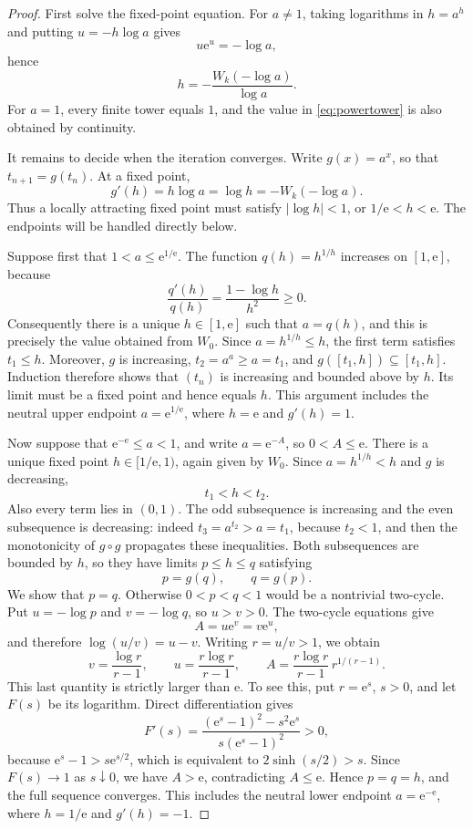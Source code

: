 \documentclass[11pt,openany]{book}
\newcommand{\e}{\mathrm{e}}
\newcommand{\abs}[1]{\left|#1\right|}
\theoremstyle{plain}
\theoremstyle{definition}
\theoremstyle{remark}
\begin{document}
\begin{proof}
First solve the fixed-point equation.  For \(a\ne1\), taking logarithms in
\(h=a^h\) and putting \(u=-h\log a\) gives
\[
             u\e^u=-\log a,
\]
hence
\[
             h=-\frac{W_k(-\log a)}{\log a}.
\]
For \(a=1\), every finite tower equals \(1\), and the value in
\eqref{eq:powertower} is also obtained by continuity.

It remains to decide when the iteration converges.  Write
\(g(x)=a^x\), so that \(t_{n+1}=g(t_n)\).  At a fixed point,
\[
       g'(h)=h\log a=\log h=-W_k(-\log a).
\]
Thus a locally attracting fixed point must satisfy \(\abs{\log h}<1\), or
\(1/\e<h<\e\).  The endpoints will be handled directly below.

Suppose first that \(1<a\le\e^{1/\e}\).  The function
\(q(h)=h^{1/h}\) increases on \([1,\e]\), because
\[
       \frac{q'(h)}{q(h)}=\frac{1-\log h}{h^2}\ge0.
\]
Consequently there is a unique \(h\in[1,\e]\) such that \(a=q(h)\), and this
is precisely the value obtained from \(W_0\).  Since
\(a=h^{1/h}\le h\), the first term satisfies \(t_1\le h\).  Moreover,
\(g\) is increasing, \(t_2=a^a\ge a=t_1\), and
\(g([t_1,h])\subseteq[t_1,h]\).  Induction therefore shows that \((t_n)\) is
increasing and bounded above by \(h\).  Its limit must be a fixed point and
hence equals \(h\).  This argument includes the neutral upper endpoint
\(a=\e^{1/\e}\), where \(h=\e\) and \(g'(h)=1\).

Now suppose that \(\e^{-\e}\le a<1\), and write \(a=\e^{-A}\), so
\(0<A\le\e\).  There is a unique fixed point \(h\in[1/\e,1)\), again given
by \(W_0\).  Since \(a=h^{1/h}<h\) and \(g\) is decreasing,
\[
        t_1<h<t_2.
\]
Also every term lies in \((0,1)\).  The odd subsequence is increasing and the
even subsequence is decreasing: indeed \(t_3=a^{t_2}>a=t_1\), because
\(t_2<1\), and then the monotonicity of \(g\circ g\) propagates these
inequalities.  Both subsequences are bounded by \(h\), so they have limits
\(p\le h\le q\) satisfying
\[
                 p=g(q),\qquad q=g(p).
\]
We show that \(p=q\).  Otherwise \(0<p<q<1\) would be a nontrivial two-cycle.
Put \(u=-\log p\) and \(v=-\log q\), so \(u>v>0\).  The two-cycle equations
give
\[
                 A=u\e^v=v\e^u,
\]
and therefore \(\log(u/v)=u-v\).  Writing \(r=u/v>1\), we obtain
\[
 v=\frac{\log r}{r-1},\qquad
 u=\frac{r\log r}{r-1},\qquad
 A=\frac{r\log r}{r-1}\,r^{1/(r-1)}.
\]
This last quantity is strictly larger than \(\e\).  To see this, put
\(r=\e^s\), \(s>0\), and let \(F(s)\) be its logarithm.  Direct
differentiation gives
\[
 F'(s)=
 \frac{(\e^s-1)^2-s^2\e^s}
      {s(\e^s-1)^2}>0,
\]
because \(\e^s-1>s\e^{s/2}\), which is equivalent to
\(2\sinh(s/2)>s\).  Since \(F(s)\to1\) as \(s\downarrow0\), we have
\(A>\e\), contradicting \(A\le\e\).  Hence \(p=q=h\), and the full sequence
converges.  This includes the neutral lower endpoint \(a=\e^{-\e}\), where
\(h=1/\e\) and \(g'(h)=-1\).


\end{proof}
\end{document}
